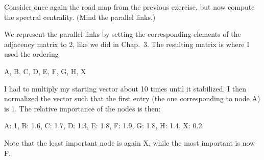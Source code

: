Consider once again the road map from the previous exercise, but now compute the spectral centrality. (Mind the parallel links.)

\solution
We represent the parallel links by setting the corresponding elements of the adjacency matrix to 2, like we did in Chap.~3. The resulting matrix is 
where I used the ordering 
\begin{center}
A, B, C, D, E, F, G, H, X  
\end{center}
I had to multiply my starting vector about 10 times until it stabilized. I then normalized the vector such that the first entry (the one corresponding to node A) is 1. The relative importance of the nodes is then:
\begin{center}
A: 1, B: 1.6, C: 1.7, D: 1.3, E: 1.8, F: 1.9, G: 1.8, H: 1.4, X: 0.2
\end{center}
Note that the least important node is again X, while the most important is now F. 
